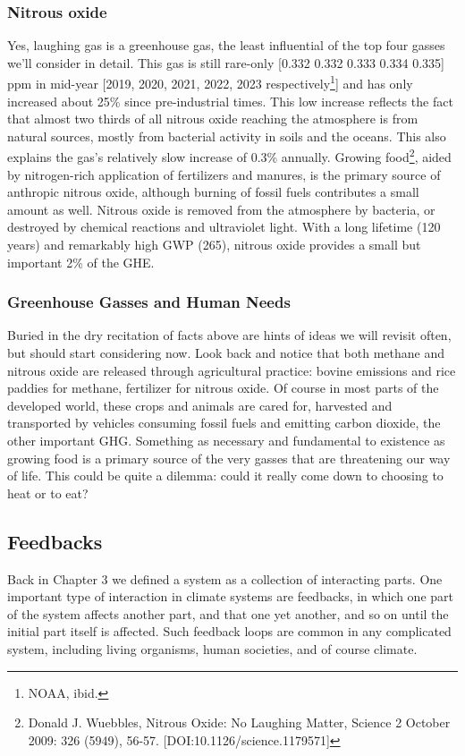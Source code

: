 \documentclass[amstex,12pt]{book}
\begin{document}
\subsubsection{Nitrous oxide}
Yes, laughing gas is a greenhouse gas, the least influential of the top four gasses we'll consider in detail. This gas is still rare-only [0.332 0.332 0.333 0.334 0.335] ppm in mid-year [2019, 2020, 2021, 2022, 2023 respectively\footnote{NOAA, ibid.}] and has only increased about 25\% since pre-industrial times. This low increase reflects the fact that almost two thirds of all nitrous oxide reaching the atmosphere is from natural sources, mostly from bacterial activity in soils and the oceans. This also explains the gas's relatively slow increase of 0.3\% annually. Growing food\footnote{Donald J. Wuebbles, Nitrous Oxide: No Laughing Matter, Science 2 October 2009: 326 (5949), 56-57. [DOI:10.1126/science.1179571]}, aided by nitrogen-rich application of fertilizers and manures, is the primary source of anthropic nitrous oxide, although burning of fossil fuels contributes a small amount as well. Nitrous oxide is removed from the atmosphere by bacteria, or destroyed by chemical reactions and ultraviolet light. With a long lifetime (120 years) and remarkably high GWP (265), nitrous oxide provides a small but important 2\% of the GHE.\\
\subsubsection{Greenhouse Gasses and Human Needs}
Buried in the dry recitation of facts above are hints of ideas we will revisit often, but should start considering now. Look back and notice that both methane and nitrous oxide are released through agricultural practice: bovine emissions and rice paddies for methane, fertilizer for nitrous oxide. Of course in most parts of the developed world, these crops and animals are cared for, harvested and transported by vehicles consuming fossil fuels and emitting carbon dioxide, the other important GHG. Something as necessary and fundamental to existence as growing food is a primary source of the very gasses that are threatening our way of life. This could be quite a dilemma: could it really come down to choosing to heat or to eat?\\

\subsection{Feedbacks}
Back in Chapter 3 we defined a system as a collection of interacting parts. One important type of interaction in climate systems are feedbacks, in which one part of the system affects another part, and that one yet another, and so on until the initial part itself is affected. Such feedback loops are common in any complicated system, including living organisms, human societies, and of course climate.\\
\end{document}
